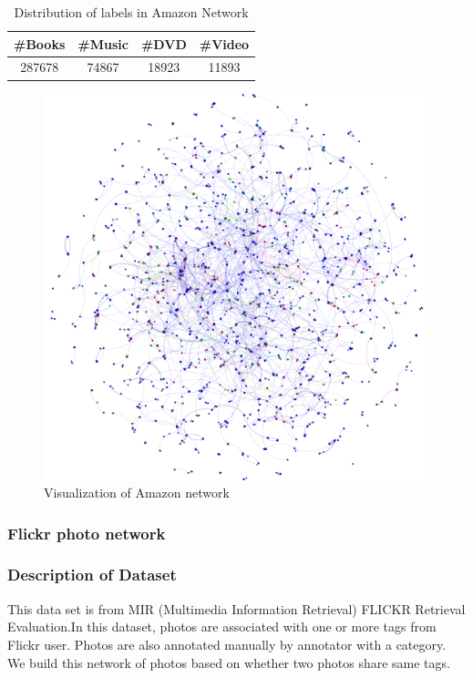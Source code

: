 \begin{table}[!ht]
\centering
\begin{tabular}{cccc}
\toprule
\textbf{\#Books} & \textbf{\#Music} & \textbf{\#DVD} & \textbf{\#Video}\\
\midrule
287678 & 74867 & 18923 & 11893\\
\bottomrule
\end{tabular}
\caption{Distribution of labels in Amazon Network}
\end{table} 

\begin{figure}[!ht]
	\centering
	\begin{minipage}[b]{0.5\linewidth}
	\centering
	\includegraphics[width=\textwidth]{FIG/amazon.png}
	\caption{Visualization of Amazon network}
	\label{fig:figure1}
	\end{minipage}
\end{figure}	


\subsubsection{Flickr photo network}

\subsubsection*{Description of Dataset}
This data set is from MIR (Multimedia Information Retrieval) FLICKR Retrieval Evaluation.In this dataset, photos are associated with one or more tags from Flickr user. Photos are also annotated manually by annotator with a category. We build this network of photos based on whether two photos share same tags. 

